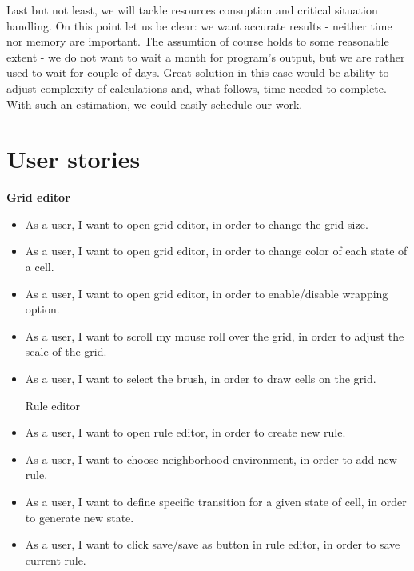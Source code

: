 \documentclass{article}
\begin{document}
Last but not least, we will tackle resources consuption and critical situation handling. On this point let us be clear: we want accurate results - neither time nor memory are important. The assumtion of course holds to some reasonable extent - we do not want to wait a month for program's output, but we are rather used to wait for couple of days. Great solution in this case would be ability to adjust complexity of calculations and, what follows, time needed to complete. With such an estimation, we could easily schedule our work.

\section{User stories}
	\hspace{15pt} {\bf Grid editor}
\begin{itemize}	
	\item 
		As a user, 
		I want to open grid editor,
		in order to change the grid size.

	\item 
		As a user, 
		I want to open grid editor,
		in order to change color of each state of a cell.

	\item 
		As a user, 
		I want to open grid editor,
		in order to enable/disable wrapping option.

	\item 
		As a user, 
		I want to scroll my mouse roll over the grid,
		in order to adjust the scale of the grid.

	\item 
		As a user, 
		I want to select the brush,
		in order to draw cells on the grid.

	\vspace{30pt}
	Rule editor
	
	\item 
		As a user,
		I want to open rule editor,
		in order to create new rule.
		
	\item 
		As a user,
		I want to choose neighborhood environment,
		in order to add new rule.
		
	\item 
		As a user,
		I want to define specific transition for a given state of cell,
		in order to generate new state.
		
	\item 
		As a user,
		I want to click save/save as button in rule editor,
		in order to save current rule.


\end{itemize}
\end{document}
